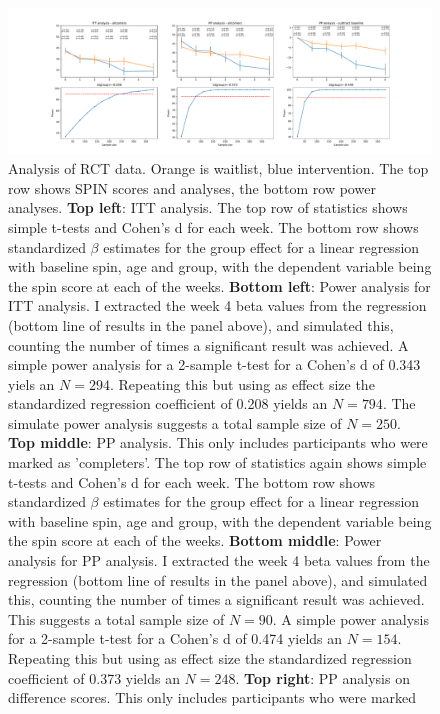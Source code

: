\begin{figure}
\begin{center}
\includegraphics[width=\textwidth]{RCT_poweranalysis.pdf}
\end{center}
\caption{Analysis of RCT data. Orange is waitlist, blue intervention. The top
row shows SPIN scores and analyses, the bottom row power analyses. 
%
{\bf Top left}: ITT analysis. The top row of statistics shows simple t-tests and Cohen's d for each
week. The bottom row shows standardized $\beta$ estimates for the group effect
for a linear regression with baseline spin, age and group, with the dependent
variable being the spin score at each of the weeks. 
%
{\bf Bottom left}: Power analysis for ITT analysis. I extracted the week 4 beta
values from the regression (bottom line of results in the panel above), and
simulated this, counting the number of times a significant result was achieved.
A simple power analysis for a 2-sample t-test for a Cohen's d of 0.343 yiels an
$N=294$. Repeating this but using as effect size the standardized regression
coefficient of 0.208 yields an $N=794$. The simulate power analysis suggests a
total sample size of $N=250$. 
%
{\bf Top middle}: PP analysis. This only includes participants who were marked
as 'completers'. The top row of statistics again shows simple t-tests and Cohen's d for each
week. The bottom row shows standardized $\beta$ estimates for the group effect
for a linear regression with baseline spin, age and group, with the dependent
variable being the spin score at each of the weeks. 
%
{\bf Bottom middle}: Power analysis for PP analysis. I extracted the week 4 beta
values from the regression (bottom line of results in the panel above), and
simulated this, counting the number of times a significant result was achieved.
This suggests a total sample size of $N=90$. 
A simple power analysis for a 2-sample t-test for a Cohen's d of 0.474 yields an
$N=154$. Repeating this but using as effect size the standardized regression
coefficient of 0.373 yields an $N=248$. 
%
{\bf Top right}: PP analysis on difference scores. This only includes participants who were marked
}
\end{figure}
